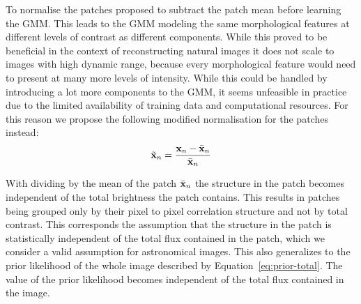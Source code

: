 \documentclass[twocolumn]{aastex631}
\DeclareMathOperator{\arcsinh}{arcsinh}
\newcommand{\todo}[1]{\textcolor{red}{TODO: #1}\PackageWarning{TODO:}{#1!}}
\begin{document}
    To normalise the patches \cite{Zoran2011} proposed to subtract the patch mean before learning the GMM. This leads to the GMM modeling the same morphological features at different levels of contrast as different components. While this proved to be beneficial in the context of reconstructing natural images it does not scale to images with high dynamic range, because every morphological feature would need to present at many more levels of intensity. While this could be handled by introducing a lot more components to the GMM, it seems unfeasible in practice due to the limited availability of training data and computational resources. For this reason we propose the following modified normalisation for the patches instead:
    \begin{equation}
        \label{eq:patch-norm}
        \tilde{\mathbf{x}}_n = \frac{\mathbf{x}_n - \Bar{\mathbf{x}}_n}{\Bar{\mathbf{x}}_n}
    \end{equation}
    
    With dividing by the mean of the patch $\Bar{\mathbf{x}}_n$ the structure in the patch becomes independent of the total brightness the patch contains. This results in patches being grouped only by their pixel to pixel correlation structure and not by total contrast. This corresponds the assumption that the structure in the patch is statistically independent of the total flux contained in the patch, which we consider a valid assumption for astronomical images. This also generalizes to the prior likelihood of the whole image described by Equation~\ref{eq:prior-total}. The value of the prior likelihood becomes independent of the total flux contained in the image.
    



\end{document}
